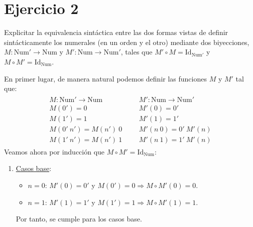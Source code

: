 \section{Ejercicio 2}
\begin{enun}
    Explicitar la equivalencia sintáctica entre las dos formas vistas de definir
    sintácticamente los numerales (en un orden y el otro) mediante dos
    biyecciones, $M: \mathrm{Num}' \rightarrow \mathrm{Num}$ y
    $M': \mathrm{Num} \rightarrow \mathrm{Num}'$, tales que $M' \circ M =
    \mathrm{Id}_{\mathrm{Num}'}$ y $M \circ M' = \mathrm{Id}_{\mathrm{Num}}$.
\end{enun}
\begin{sol}
    En primer lugar, de manera natural podemos definir las funciones $M$ y $M'$
    tal que:
    \begin{align*}
        \begin{gathered}
            M: \mathrm{Num}' \rightarrow \mathrm{Num}\\
            M\left( 0' \right) = 0\\
            M\left( 1' \right) = 1\\
            M\left( 0'\ n' \right) = M\left( n' \right)\ 0\\
            M\left( 1'\ n' \right) = M\left( n' \right)\ 1
        \end{gathered}
        &&
        \begin{gathered}
            M': \mathrm{Num} \rightarrow \mathrm{Num}'\\
            M'\left( 0 \right) = 0'\\
            M'\left( 1 \right) = 1'\\
            M'\left( n\ 0 \right) = 0'\ M'\left( n \right)\\
            M'\left( n\ 1 \right) = 1'\ M'\left( n \right)
        \end{gathered}
    \end{align*}
    Veamos ahora por inducción que $M \circ M' = \mathrm{Id}_{\mathrm{Num}}$:
    \begin{enumerate}
        \item \underline{Casos base}:
        \begin{itemize}
            \item $n = 0$: $M'\left( 0 \right) = 0'$ y $M\left( 0' \right) = 0
                \Rightarrow M \circ M' \left( 0 \right) = 0$.
            \item $n = 1$: $M'\left( 1 \right) = 1'$ y $M\left( 1'
                \right) = 1 \Rightarrow M \circ M' \left( 1 \right) = 1$.
        \end{itemize}
        Por tanto, se cumple para los casos base.


\end{enumerate}
\end{sol}
